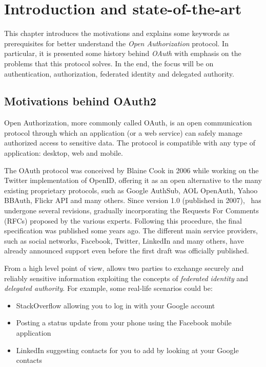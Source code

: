
\chapter{Introduction and state-of-the-art}
This chapter introduces the motivations and explains some keywords as prerequisites for better understand the \textit{Open Authorization} protocol. In particular, it is presented some history behind \textit{OAuth} with emphasis on the problems that this protocol solves. In the end, the focus will be on authentication, authorization, federated identity and delegated authority.

\minitoc

\section{Motivations behind OAuth2}
Open Authorization, more commonly called OAuth, is an open communication protocol through which an application (or a web service) can safely manage authorized access to sensitive data. The protocol is compatible with any type of application: desktop, web and mobile.

The OAuth protocol was conceived by Blaine Cook in 2006 while working on the Twitter implementation of OpenID, offering it as an open alternative to the many existing proprietary protocols, such as Google AuthSub, AOL OpenAuth, Yahoo BBAuth, Flickr API and many others. Since version 1.0 (published in 2007), \oauth\ has undergone several revisions, gradually incorporating the Requests For Comments (RFCs) proposed by the various experts. Following this procedure, the final specification was published some years ago. The different main service providers, such as social networks, Facebook, Twitter, LinkedIn and many others, have already announced support even before the first draft was officially published.

From a high level point of view, \textit{\oauth} allows two parties to exchange securely and reliably sensitive information exploiting the concepts of \textit{federated identity} and \textit{delegated authority}. For example, some real-life scenarios could be:

\begin{itemize}
    \item StackOverflow allowing you to log in with your Google account
    \item Posting a status update from your phone using the Facebook mobile application
    \item LinkedIn suggesting contacts for you to add by looking at your Google contacts
\end{itemize}

